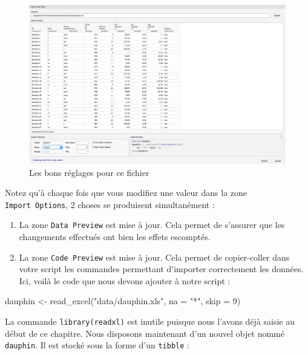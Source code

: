 \documentclass[
  letterpaper,
  DIV=11,
  numbers=noendperiod]{scrreprt}
\newenvironment{Shaded}{\begin{snugshade}}{\end{snugshade}}
\newcommand{\AttributeTok}[1]{\textcolor[rgb]{0.40,0.45,0.13}{#1}}
\newcommand{\DecValTok}[1]{\textcolor[rgb]{0.68,0.00,0.00}{#1}}
\newcommand{\FunctionTok}[1]{\textcolor[rgb]{0.28,0.35,0.67}{#1}}
\newcommand{\NormalTok}[1]{\textcolor[rgb]{0.00,0.23,0.31}{#1}}
\newcommand{\OtherTok}[1]{\textcolor[rgb]{0.00,0.23,0.31}{#1}}
\newcommand{\StringTok}[1]{\textcolor[rgb]{0.13,0.47,0.30}{#1}}
\providecommand{\tightlist}{%
  \setlength{\itemsep}{0pt}\setlength{\parskip}{0pt}}\usepackage{longtable,booktabs,array}
\begin{document}
\begin{figure}

{\centering \includegraphics[width=1\textwidth,height=\textheight]{./images/import3.png}

}

\caption{Les bons réglages pour ce fichier}

\end{figure}

Notez qu'à chaque fois que vous modifiez une valeur dans la zone
\texttt{Import\ Options}, 2 choses se produisent simultanément :

\begin{enumerate}
\def\labelenumi{\arabic{enumi}.}
\tightlist
\item
  La zone \texttt{Data\ Preview} est mise à jour. Cela permet de
  s'assurer que les changements effectués ont bien les effets escomptés.
\item
  La zone \texttt{Code\ Preview} est mise à jour. Cela permet de
  copier-coller dans votre script les commandes permettant d'importer
  correctement les données. Ici, voilà le code que nous devons ajouter à
  notre script :
\end{enumerate}

\begin{Shaded}
\begin{Highlighting}[]
\NormalTok{dauphin }\OtherTok{\textless{}{-}} \FunctionTok{read\_excel}\NormalTok{(}\StringTok{"data/dauphin.xls"}\NormalTok{, }\AttributeTok{na =} \StringTok{"*"}\NormalTok{, }\AttributeTok{skip =} \DecValTok{9}\NormalTok{)}
\end{Highlighting}
\end{Shaded}

La commande \texttt{library(readxl)} est inutile puisque nous l'avons
déjà saisie au début de ce chapitre. Nous disposons maintenant d'un
nouvel objet nommé \texttt{dauphin}. Il est stocké sous la forme d'un
\texttt{tibble} :
\end{document}

